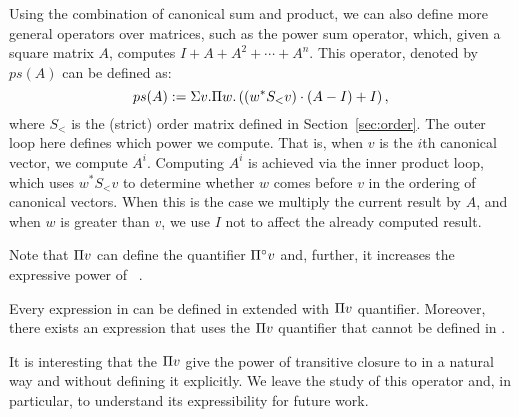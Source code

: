 Using the combination of canonical sum and product, we can also define more general operators over matrices, such as the power sum operator, which, given a square matrix $A$, computes $I + A + A^2 + \cdots + A^n$. This operator, denoted by $ps(A)$ can be defined as:
$$ps(A) := \Sigma v.\Pi w. \left( (w^* S_{<} v)\cdot (A-I) + I\right),$$
where $S_{<}$ is the (strict) order matrix defined in Section~\ref{sec:order}. The outer loop here defines which power we compute. That is, when $v$ is the $i$th canonical vector, we compute $A^i$. Computing $A^i$ is achieved via the inner product loop, which uses $w^*S_{<}v$ to determine whether $w$ comes before $v$ in the ordering of canonical vectors. When this is the case we multiply the current result by $A$, and when $w$ is greater than $v$, we use $I$ not to affect the already computed result.

Note that $\Pi v$ can define the quantifier $\Pi^{\circ} v$ and, further, it increases the expressive power of \langprod~.
\begin{proposition}
	Every expression in \langprod can be defined in \langsum extended with $\Pi v$ quantifier. Moreover, there exists an expression that uses the $\Pi v$ quantifier that cannot be defined in \langprod.
\end{proposition}

It is interesting that the $\Pi v$ give the power of transitive closure to \langsum in a natural way and without defining it explicitly. We leave the study of this operator and, in particular, to understand its expressibility for future work. 


